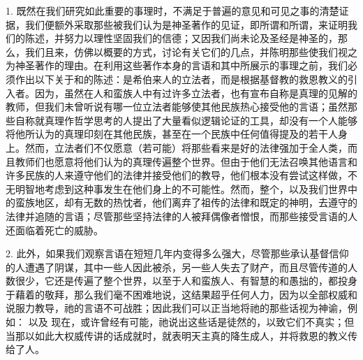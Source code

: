 1. 既然在我们研究如此重要的事理时，不满足于普遍的意见和可见之事的清楚证据，我们便额外采取那些被我们认为是神圣著作的见证，即所谓和所谓，来证明我们的陈述，并努力以理性坚固我们的信德；又因我们尚未论及圣经是神圣的，那么，我们且来，仿佛以概要的方式，讨论有关它们的几点，并陈明那些使我们视之为神圣著作的理由。在利用这些著作本身的言语和其中所展示的事理之前，我们必须作出以下关于和的陈述：是希伯来人的立法者，而是根据基督教的救恩教义的引入者。因为，虽然在人和蛮族人中有过许多立法者，也有宣布自称是真理的见解的教师，但我们未曾听说有哪一位立法者能够使其他民族热心接受他的言语；虽然那些自称就真理作哲学思考的人提出了大量看似逻辑论证的工具，却没有一个人能够将他所认为的真理印刻在其他民族，甚至在一个民族中任何值得提及的若干人身上。然而，立法者们不仅愿意（若可能）将那些看来是好的法律强加于全人类，而且教师们也愿意将他们认为的真理传遍整个世界。但由于他们无法召唤其他语言和许多民族的人来遵守他们的法律并接受他们的教导，他们根本没有尝试这样做，不无明智地考虑到这种事发生在他们身上的不可能性。然而，整个，以及我们世界中的蛮族地区，却有无数的热忱者，他们离弃了祖传的法律和既定的神明，去遵守的法律并追随的言语；尽管那些坚持法律的人被拜偶像者憎恨，而那些接受言语的人还面临着死亡的威胁。\par

2. 此外，如果我们观察言语在短短几年内变得多么强大，尽管那些承认基督信仰的人遭遇了阴谋，其中一些人因此被杀，另一些人失去了财产，而且尽管传道的人数很少，它还是传遍了整个世界，以至于人和蛮族人、有智慧的和愚拙的，都投身于藉着的敬拜，那么我们毫不困难地说，这结果超乎任何人力，因为以全部权威和说服力教导，祂的言语不可战胜；因此我们可以正当地将祂的那些话视为神谕，例如： 以及 现在，或许曾经有可能，祂说出这些话是徒然的，以致它们不真实；但当那以如此大权威传讲的话成就时，就表明天主真的降生成人，并将救恩的教义传给了人。\par

